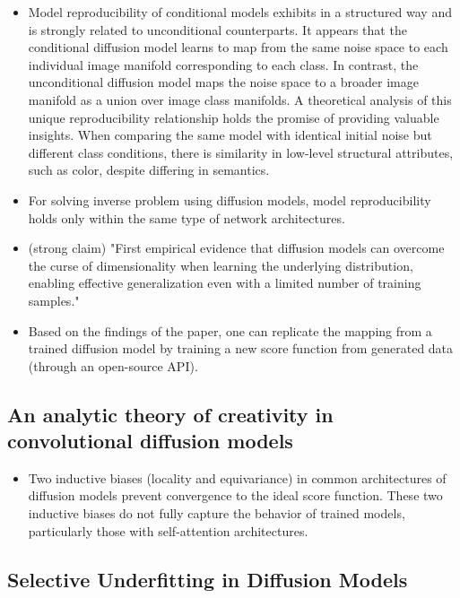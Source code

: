 \documentclass{article}
\begin{document}
\begin{itemize}
    \item Model reproducibility of conditional models exhibits in a structured way and is strongly related to unconditional counterparts. It appears that the conditional diffusion model learns to map from the same noise space to each individual image manifold corresponding to each class. In contrast, the unconditional diffusion model maps the noise space to a broader image manifold as a union over image class manifolds. A theoretical analysis of this unique reproducibility relationship holds the promise of providing valuable insights. When comparing the same model with identical initial noise but different class conditions, there is similarity in low-level structural attributes, such as color, despite differing in semantics.
    \item For solving inverse problem using diffusion models, model reproducibility holds only within the same type of network architectures. 
    \item (strong claim) "First empirical evidence that diffusion models can overcome the curse of dimensionality when learning the underlying distribution, enabling effective generalization even with a limited number of training samples."
    \item Based on the findings of the paper, one can replicate the mapping from a trained diffusion model by training a new score function from generated data (through an open-source API).
\end{itemize}

\subsection{An analytic theory of creativity in convolutional diffusion models}
\begin{itemize}
    \item Two inductive biases (locality and equivariance) in common architectures of diffusion models prevent convergence to the ideal score function. These two inductive biases do not fully capture the behavior of trained models, particularly those with self-attention architectures.
\end{itemize}

\subsection{Selective Underfitting in Diffusion Models}
\end{document}
